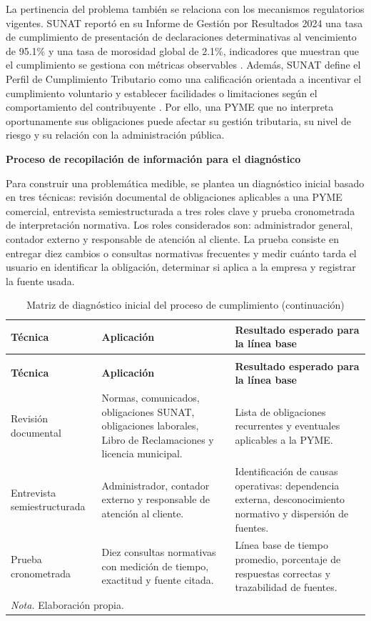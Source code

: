 \documentclass[12pt,a4paper,oneside]{report}
\begin{document}
La pertinencia del problema también se relaciona con los mecanismos regulatorios vigentes. SUNAT reportó en su Informe de Gestión por Resultados 2024 una tasa de cumplimiento de presentación de declaraciones determinativas al vencimiento de 95.1\% y una tasa de morosidad global de 2.1\%, indicadores que muestran que el cumplimiento se gestiona con métricas observables \parencite{sunatGestion2024}. Además, SUNAT define el Perfil de Cumplimiento Tributario como una calificación orientada a incentivar el cumplimiento voluntario y establecer facilidades o limitaciones según el comportamiento del contribuyente \parencite{sunatPerfilCumplimiento2026}. Por ello, una PYME que no interpreta oportunamente sus obligaciones puede afectar su gestión tributaria, su nivel de riesgo y su relación con la administración pública.

\textbf{Proceso de recopilación de información para el diagnóstico}

Para construir una problemática medible, se plantea un diagnóstico inicial basado en tres técnicas: revisión documental de obligaciones aplicables a una PYME comercial, entrevista semiestructurada a tres roles clave y prueba cronometrada de interpretación normativa. Los roles considerados son: administrador general, contador externo y responsable de atención al cliente. La prueba consiste en entregar diez cambios o consultas normativas frecuentes y medir cuánto tarda el usuario en identificar la obligación, determinar si aplica a la empresa y registrar la fuente usada.

\begin{longtable}{@{}p{}p{}p{}@{}}
\caption{Matriz de diagnóstico inicial del proceso de cumplimiento}\label{tab:matriz-diagnostico}\\
\toprule
\textbf{Técnica} & \textbf{Aplicación} & \textbf{Resultado esperado para la línea base} \\
\midrule
\endfirsthead
\caption[]{Matriz de diagnóstico inicial del proceso de cumplimiento (continuación)}\\
\toprule
\textbf{Técnica} & \textbf{Aplicación} & \textbf{Resultado esperado para la línea base} \\
\midrule
\endhead
Revisión documental & Normas, comunicados, obligaciones SUNAT, obligaciones laborales, Libro de Reclamaciones y licencia municipal. & Lista de obligaciones recurrentes y eventuales aplicables a la PYME. \\
Entrevista semiestructurada & Administrador, contador externo y responsable de atención al cliente. & Identificación de causas operativas: dependencia externa, desconocimiento normativo y dispersión de fuentes. \\
Prueba cronometrada & Diez consultas normativas con medición de tiempo, exactitud y fuente citada. & Línea base de tiempo promedio, porcentaje de respuestas correctas y trazabilidad de fuentes. \\
\bottomrule
\multicolumn{3}{p{0.94\textwidth}}{\normalsize \textit{Nota.} Elaboración propia.}\\
\end{longtable}
\end{document}
